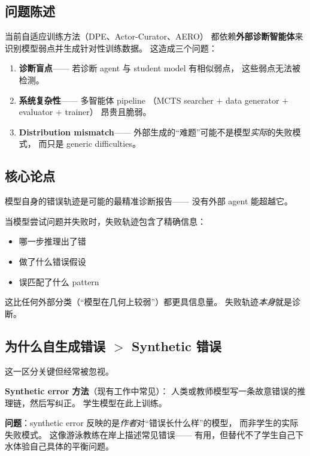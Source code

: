 \documentclass[12pt,a4paper]{article}
\begin{document}
\subsection{问题陈述}

当前自适应训练方法（DPE、Actor-Curator、AERO）
都依赖\textbf{外部诊断智能体}来识别模型弱点并生成针对性训练数据。
这造成三个问题：

\begin{enumerate}[leftmargin=2em]
  \item \textbf{诊断盲点}——
    若诊断 agent 与 student model 有相似弱点，
    这些弱点无法被检测。
  \item \textbf{系统复杂性}——
    多智能体 pipeline
    （MCTS searcher $+$ data generator $+$ evaluator $+$ trainer）
    昂贵且脆弱。
  \item \textbf{Distribution mismatch}——
    外部生成的``难题''可能不是模型\textit{实际}的失败模式，
    而只是 generic difficulties。
\end{enumerate}

\subsection{核心论点}

\begin{insightbox}
模型自身的错误轨迹是可能的最精准诊断报告——
没有外部 agent 能超越它。
\end{insightbox}

\noindent
当模型尝试问题并失败时，失败轨迹包含了精确信息：
\begin{itemize}[leftmargin=2em]
  \item 哪一步推理出了错
  \item 做了什么错误假设
  \item 误匹配了什么 pattern
\end{itemize}

\noindent
这比任何外部分类（``模型在几何上较弱''）都更具信息量。
失败轨迹\textit{本身}就是诊断。

\subsection{为什么自生成错误 $>$ Synthetic 错误}

这一区分关键但经常被忽视。

\textbf{Synthetic error 方法}（现有工作中常见）：
人类或教师模型写一条故意错误的推理链，然后写纠正。
学生模型在此上训练。

\textbf{问题}：synthetic error 反映的是\textit{作者}对``错误长什么样''的模型，
而非学生的实际失败模式。
这像游泳教练在岸上描述常见错误——
有用，但替代不了学生自己下水体验自己具体的平衡问题。
\end{document}
